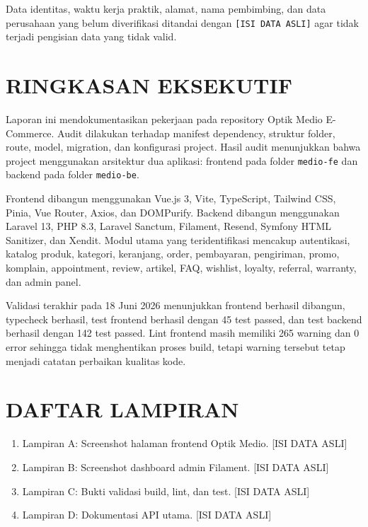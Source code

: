 \documentclass[12pt,a4paper]{report}
\begin{document}
Data identitas, waktu kerja praktik, alamat, nama pembimbing, dan data perusahaan yang belum diverifikasi ditandai dengan \texttt{[ISI DATA ASLI]} agar tidak terjadi pengisian data yang tidak valid.

\chapter*{RINGKASAN EKSEKUTIF}
Laporan ini mendokumentasikan pekerjaan pada repository Optik Medio E-Commerce. Audit dilakukan terhadap manifest dependency, struktur folder, route, model, migration, dan konfigurasi project. Hasil audit menunjukkan bahwa project menggunakan arsitektur dua aplikasi: frontend pada folder \texttt{medio-fe} dan backend pada folder \texttt{medio-be}.

Frontend dibangun menggunakan Vue.js 3, Vite, TypeScript, Tailwind CSS, Pinia, Vue Router, Axios, dan DOMPurify. Backend dibangun menggunakan Laravel 13, PHP 8.3, Laravel Sanctum, Filament, Resend, Symfony HTML Sanitizer, dan Xendit. Modul utama yang teridentifikasi mencakup autentikasi, katalog produk, kategori, keranjang, order, pembayaran, pengiriman, promo, komplain, appointment, review, artikel, FAQ, wishlist, loyalty, referral, warranty, dan admin panel.

Validasi terakhir pada 18 Juni 2026 menunjukkan frontend berhasil dibangun, typecheck berhasil, test frontend berhasil dengan 45 test passed, dan test backend berhasil dengan 142 test passed. Lint frontend masih memiliki 265 warning dan 0 error sehingga tidak menghentikan proses build, tetapi warning tersebut tetap menjadi catatan perbaikan kualitas kode.

\tableofcontents
\listoffigures
\listoftables

\chapter*{DAFTAR LAMPIRAN}
\begin{enumerate}
    \item Lampiran A: Screenshot halaman frontend Optik Medio. [ISI DATA ASLI]
    \item Lampiran B: Screenshot dashboard admin Filament. [ISI DATA ASLI]
    \item Lampiran C: Bukti validasi build, lint, dan test. [ISI DATA ASLI]
    \item Lampiran D: Dokumentasi API utama. [ISI DATA ASLI]
\end{enumerate}
\end{document}
